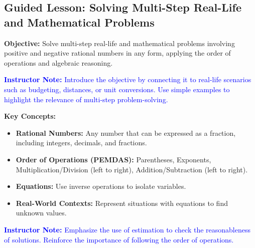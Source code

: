 \documentclass[12pt]{article}
\title{}
\date{}
\begin{document}
\subsection*{Guided Lesson: Solving Multi-Step Real-Life and Mathematical Problems}
\onehalfspacing

\begin{tcolorbox}[colframe=black!40, colback=gray!5, 
coltitle=black, colbacktitle=black!20, fonttitle=\bfseries\Large, 
title=Learning Objective, halign title=center, left=5pt, right=5pt, top=5pt, bottom=15pt]
\textbf{Objective:} Solve multi-step real-life and mathematical problems involving positive and negative rational numbers in any form, applying the order of operations and algebraic reasoning.

\textcolor{blue}{\textbf{Instructor Note:} Introduce the objective by connecting it to real-life scenarios such as budgeting, distances, or unit conversions. Use simple examples to highlight the relevance of multi-step problem-solving.}
\end{tcolorbox}

\vspace{1em}

\begin{tcolorbox}[colframe=black!60, colback=white, 
coltitle=black, colbacktitle=black!15, fonttitle=\bfseries\Large, 
title=Key Concepts and Vocabulary, halign title=center, left=10pt, right=10pt, top=10pt, bottom=15pt]
\textbf{Key Concepts:}
\begin{itemize}
    \item \textbf{Rational Numbers:} Any number that can be expressed as a fraction, including integers, decimals, and fractions.
    \item \textbf{Order of Operations (PEMDAS):} Parentheses, Exponents, Multiplication/Division (left to right), Addition/Subtraction (left to right).
    \item \textbf{Equations:} Use inverse operations to isolate variables.
    \item \textbf{Real-World Contexts:} Represent situations with equations to find unknown values.
\end{itemize}

\textcolor{blue}{\textbf{Instructor Note:} Emphasize the use of estimation to check the reasonableness of solutions. Reinforce the importance of following the order of operations.}
\end{tcolorbox}
\end{document}
